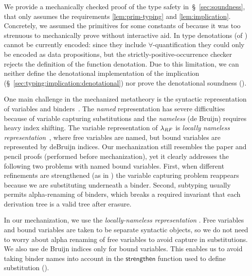 We provide a mechanically checked
proof of the type safety in~\S~\ref{sec:soundness}, 
that only assumes the requirements
\ref{lem:prim-typing} and \ref{lem:implication}. 
%
Concretely, we assumed the primitives  for some 
constants of \sysrf because 
it was too strenuous to mechanically prove 
without interactive aid. 
%
In \lh type denotations (of ) 
cannot be currently encoded: 
since they include $\forall$-quantification
they could only be encoded as data propositions, 
but the strictly-positive-occurrence checker 
rejects the definition of the function denotation. 
Due to this limitation, 
we can neither define the denotational implementation
of the implication (\S~\ref{sec:typing:implication:denotational})
nor prove 
the denotational soundness (). 


One main challenge in the mechanized
metatheory is the syntactic representation
of variables and binders~\cite{Aydemir05}.
%
The \emph{named} representation
has severe difficulties because
of variable capturing substitutions
and the \emph{nameless} (\aka de Bruijn)
requires heavy index shifting.
%
The variable representation
of $\lambda_{RF}$ is
\emph{locally nameless representation}~\cite{Pollack93,AydemirCPPW08},
where free variables are named, but
bound variables are represented by
deBruijn indices.
%
Our mechanization still resembles
the paper and pencil proofs (performed
before  mechanization),
yet it clearly addresses
the following two problems with named bound variables.
%
First, when different refinements are strengthened
(as in ) the variable
capturing problem reappears
because we are substituting underneath a binder.
%
Second, subtyping usually permits
alpha-renaming of binders,
which breaks a required invariant
that each \sysrf derivation tree
is a valid \sysf tree after erasure. \\

\begin{fullversion}
%
In our mechanization, we use the
\emph{locally-nameless representation} \cite{AydemirCPPW08,Chargueraud12}.
%
Free variables and bound variables
are taken to be separate syntactic
objects, so we do not need to worry
about alpha renaming of free variables
to avoid capture in substitutions.
%
We also use de Bruijn indices only
for bound variables. This enables us to avoid
taking binder names into account in the
$\mathsf{strengthen}$ function used to define
substitution ().
%
%
\end{fullversion}

